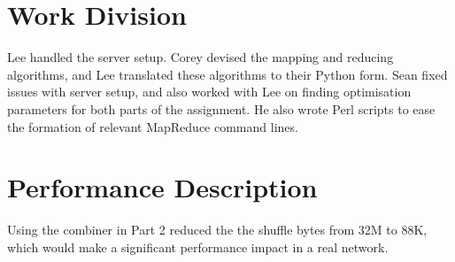 \documentclass[14pt]{extarticle}
\begin{document}
\section{Work Division}
Lee handled the server setup. Corey devised the mapping and reducing algorithms, and Lee
translated these algorithms to their Python form. Sean fixed issues with server setup,
and also worked with Lee on finding optimisation parameters for both parts of the
assignment. He also wrote Perl scripts to ease the formation of relevant MapReduce
command lines.

\section{Performance Description}
Using the combiner in Part 2 reduced the the shuffle bytes from 32M to 88K, which
would make a significant performance impact in a real network.
\end{document}
